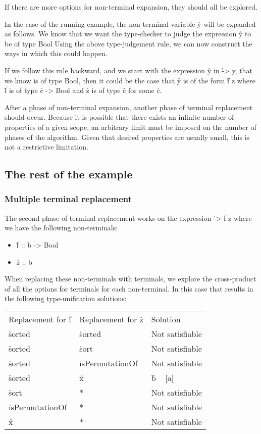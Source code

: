 \documentclass[a4paper, 11pt]{article}
\begin{document}
If there are more options for non-terminal expansion, they should all be explored.

In the case of the running example, the non-terminal variable \h{y} will be expanded as follows.
We know that we want the type-checker to judge the expression \h{y} to be of type \h{Bool}
Using the above type-judgement rule, we can now construct the ways in which this could happen.

If we follow this rule backward, and we start with the expression \h{y} in \h{\x -> y}, that we know is of type \h{Bool}, then it could be the case that \h{y} is of the form \h{f z} where \h{f} is of type \h{c -> Bool} and \h{z} is of type \h{c} for some \h{c}.

After a phase of non-terminal expansion, another phase of terminal replacement should occur.
Because it is possible that there exists an infinite number of properties of a given scope, an arbitrary limit must be imposed on the number of phases of the algorithm.
Given that desired properties are usually small, this is not a restrictive limitation.


\subsection{The rest of the example}

\subsubsection{Multiple terminal replacement}

The second phase of terminal replacement works on the expression \h{\x -> f z} where we have the following non-terminals:

\begin{itemize}
  \item \h{f :: b -> Bool}
  \item \h{z :: b}
\end{itemize}

When replacing these non-terminals with terminals, we explore the cross-product of all the options for terminals for each non-terminal.
In this case that results in the following type-unification solutions:

\begin{tabular}{lll}
  Replacement for \h{f} & Replacement for \h{z} & Solution \\
  \h{sorted}            & \h{sorted}            &  Not satisfiable \\
  \h{sorted}            & \h{sort}              &  Not satisfiable \\
  \h{sorted}            & \h{isPermutationOf}   &  Not satisfiable \\
  \h{sorted}            & \h{x}                 &  \h{b ~ [a]}     \\
  \h{sort}              & *                     &  Not satisfiable \\
  \h{isPermutationOf}   & *                     &  Not satisfiable \\
  \h{x}                 & *                     &  Not satisfiable \\
\end{tabular}
\end{document}

